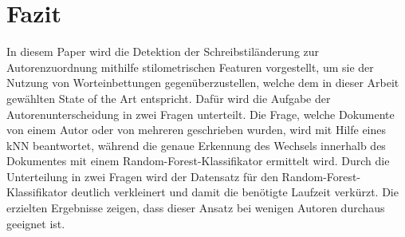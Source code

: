 \documentclass[conference]{IEEEtran}
\begin{document}
\section{Fazit}
	In diesem Paper wird die Detektion der Schreibstiländerung zur Autorenzuordnung mithilfe stilometrischen Featuren vorgestellt, um sie der Nutzung von Worteinbettungen gegenüberzustellen, welche dem in dieser Arbeit gewählten State of the Art entspricht. Dafür wird die Aufgabe der Autorenunterscheidung in zwei Fragen unterteilt. Die Frage, welche Dokumente von einem Autor oder von mehreren geschrieben wurden, wird mit Hilfe eines kNN beantwortet, während die genaue Erkennung des Wechsels innerhalb des Dokumentes mit einem Random-Forest-Klassifikator ermittelt wird. Durch die Unterteilung in zwei Fragen wird der Datensatz für den  Random-Forest-Klassifikator deutlich verkleinert und damit die benötigte Laufzeit verkürzt. Die erzielten Ergebnisse zeigen, dass dieser Ansatz bei wenigen Autoren durchaus geeignet ist.
	
	
\end{document}
